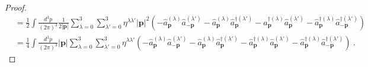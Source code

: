 \begin{proof}
        \begin{equation*}
        \begin{aligned}
            & = \frac{1}{2} \int \frac{d^3 p}{(2\pi)^3} \frac{1}{2 |\mathbf p|} \sum_{\lambda=0}^{3} \sum_{\lambda'=0}^{3} \eta^{\lambda \lambda'} |\mathbf p|^2 (- \hat a_{\mathbf p}^{(\lambda)} \hat a_{- \mathbf p}^{(\lambda')} - \hat a_{\mathbf p}^{(\lambda)} \hat a_{\mathbf p}^{\dagger (\lambda')} - \hat a_{\mathbf p}^{\dagger (\lambda)} \hat a_{\mathbf p}^{(\lambda')} - \hat a_{\mathbf p}^{\dagger (\lambda)} \hat a_{-\mathbf p}^{\dagger (\lambda')} ) \\ & = \frac{1}{4} \int \frac{d^3 p}{(2\pi)^3} |\mathbf p| \sum_{\lambda=0}^{3} \sum_{\lambda'=0}^{3} \eta^{\lambda \lambda'} (- \hat a_{\mathbf p}^{(\lambda)} \hat a_{- \mathbf p}^{(\lambda')} - \hat a_{\mathbf p}^{(\lambda)} \hat a_{\mathbf p}^{\dagger (\lambda')} - \hat a_{\mathbf p}^{\dagger (\lambda)} \hat a_{\mathbf p}^{(\lambda')} - \hat a_{\mathbf p}^{\dagger (\lambda)} \hat a_{-\mathbf p}^{\dagger (\lambda')} ) ~.
        \end{aligned}
        \end{equation*}


\end{proof}
